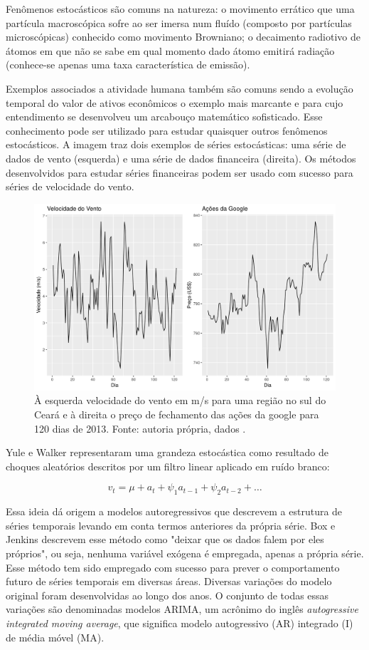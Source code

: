 \documentclass[
	12pt,				%
	openright,			%
	oneside,			%
	a4paper,			%
	english,			%
	french,				%
	spanish,			%
	brazil				%
	]{abntex2}
\begin{document}
Fenômenos estocásticos são comuns na natureza: o movimento errático que uma partícula macroscópica sofre ao ser 
imersa num fluído (composto por partículas microscópicas) conhecido como movimento Browniano; o decaimento radiotivo de átomos em que não se sabe em qual momento dado átomo emitirá radiação (conhece-se apenas uma taxa característica de emissão). 

Exemplos associados a atividade humana também são comuns sendo a evolução temporal do valor de ativos econômicos o exemplo mais marcante e para cujo entendimento se desenvolveu um arcabouço matemático sofisticado. Esse conhecimento pode ser utilizado para estudar quaisquer outros fenômenos estocásticos. A imagem traz dois exemplos de séries estocásticas: uma série de dados de vento (esquerda) e uma série de dados financeira (direita). Os métodos desenvolvidos para estudar séries financeiras podem ser usado com sucesso para séries de velocidade do vento.

\begin{figure}[h]
    \centering
	\includegraphics[width=\textwidth]{wind_money}
	\caption{À esquerda velocidade do vento em m/s para uma região no sul do Ceará e à direita o preço de fechamento das ações da google para 120 dias de 2013. Fonte: autoria própria, dados \cite{era5}.}
\end{figure}
\FloatBarrier

Yule e Walker representaram uma grandeza estocástica como resultado de choques aleatórios descritos por um filtro linear aplicado em ruído branco:

$$ v_{t} = \mu + a_t + \psi_{1}a_{t-1} + \psi_{2}a_{t-2} + \dots $$

Essa ideia dá origem a modelos autoregressivos que descrevem a estrutura de séries temporais levando em conta termos anteriores da própria série. Box e Jenkins descrevem esse método como "deixar que os dados falem por eles próprios", ou seja, nenhuma variável exógena é empregada, apenas a própria série. Esse método tem sido empregado com sucesso para prever o comportamento futuro de séries temporais em diversas áreas. Diversas variações do modelo original foram desenvolvidas ao longo dos anos. O conjunto de todas essas variações são denominadas modelos ARIMA, um acrônimo do inglês \textit{autogressive integrated moving average}, que significa modelo autogressivo (AR) integrado (I) de média móvel (MA).
\end{document}

